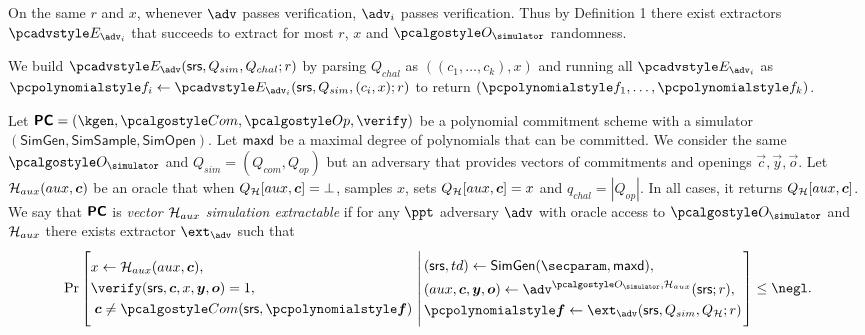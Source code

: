 \documentclass[runningheads,11pt]{llncs}
\begin{document}
On the same $r$ and $x$, whenever $\adv$ passes verification, $\adv_{i}$ passes verification.  Thus by Definition 1 there exist extractors $\Ext_{\adv_{i}}$ that succeeds to extract for most $r$, $x$ and $\oracles$ randomness.

We build $\Ext_{\adv}(\srs, Q_{sim}, Q_{chal}; r)$ by parsing $Q_{chal}$ as $((c_{1},\dots, c_{k}), x)$ and running all $\Ext_{\adv_{i}}$ as $\p{f}_{i}\gets \Ext_{\adv_{i}}(\srs,Q_{sim},(c_{i},x); r)$ to return $(\p{f}_{1},\dots,\p{f}_{k})$.

\begin{definition}
  \label{def:sepcom}
  Let $\PCOM = (\kgen, \com, \open, \verify)$ be a polynomial commitment
  scheme with a simulator $(\mathsf{SimGen}, \mathsf{SimSample}, \mathsf{SimOpen})$. Let $\mathsf{maxd}$ be a maximal degree of polynomials that can be
  committed.
  We consider the same $\oracles$ and $Q_{sim}= (Q_{com},Q_{op})$ but an adversary that provides vectors of commitments and openings $\vec{c}, \vec{y}, \vec{o}$.
   Let $\ro_{aux}(aux,\vec{c})$ be an oracle that when $Q_{\ro}[aux,\vec{c}] = \bot$, samples $x$, sets $Q_{\ro}[aux,\vec{c}]=x$ and $q_{{chal}}= |Q_{{op}}|$. In all cases, it returns $Q_{\ro}[aux,\vec{c}]$.
  We say that $\bm{\mathsf{PC}}$ is \emph{vector $\mathcal{H}_{aux}$ simulation extractable} if for any $\ppt$
  adversary $\adv$ with oracle access to $\oracles$ and $\mathcal{H}_{aux}$ there exists extractor
  $\ext_{\adv}$ such that
\[
  \Pr \left[
    \begin{aligned}
      & x \gets \ro_{aux}(aux,\vec{c}), \\
      & \verify(\srs, \vec{c}, x, \vec{y}, \vec{o}) = 1, \\
      & \;\vec{c} \neq \com(\srs, \vec{\p{f}})\\
    \end{aligned}
    \,\left|\,
      \vphantom{
        \begin{aligned}
          & \\
          & \\
          & \\
          &
        \end{aligned}
        }
    \begin{aligned}
      & (\srs, td) \gets \mathsf{SimGen}(\secparam, \maxdeg),\\
      & (aux,\vec{c},\vec{y}, \vec{o}) \gets \adv^{\oracles,\ro_{aux}}(\srs; r), \\
      & \vec{\p{f}} \gets \ext_\adv(\srs, Q_{sim}, Q_{\ro}; r)
    \end{aligned}
  \right.\right]
  \leq \negl.
\]
\end{definition}
\end{document}

